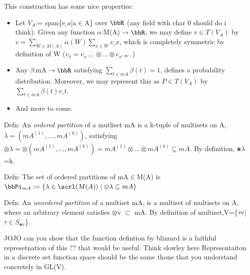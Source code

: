\documentclass[12pt,a4paper]{article}
\begin{document}
This construction has some nice properties:

\begin{itemize}
\item Let $V_A$:= span\{e\ensuremath{\_a}|a\ensuremath{\in}A\} over \ensuremath{\bbR} (any field with char 0 should do i think). Given any function \ensuremath{\alpha}:M(A)\ensuremath{\rightarrow}\ensuremath{\bbR}, we may define $v \ensuremath{\in} T(V_A)$ by $v = \ensuremath{\sum}_{W \ensuremath{\in} M(A)} \ensuremath{\alpha}(W)\ensuremath{\sum}_{x\ensuremath{\in}W}v\ensuremath{\_x}$, which is completely symmetric by definition of W ($v_x = e_{x^{(1)}}\ensuremath{\otimes}\ensuremath{\ldots}\ensuremath{\otimes}e_{x^{(\ensuremath{\smashtimes}x)}}$)


\item Any \ensuremath{\beta}:mA\ensuremath{\rightarrow}\ensuremath{\bbR} satisfying $\ensuremath{\sum}_{t \ensuremath{\in} mA} \ensuremath{\beta}(t) = 1$, defines a probability distribution. Moreover, we may represent this as $P \ensuremath{\in} T(V_A)$ by $\ensuremath{\sum}_{t\ensuremath{\in}mA} \ensuremath{\beta}(t)v\ensuremath{\_t}$.


\item And more to come.

\end{itemize}

Defn: An \emph{ordered partition} of a mutliset mA is a k-tuple of multisets on A,$\ensuremath{\lambda}=(mA^{(1)},\ensuremath{\ldots},mA^{(k)})$, satisfying $\ensuremath{\otimes}\ensuremath{\lambda}=\ensuremath{\otimes}(mA^{(1)},\ensuremath{\ldots},mA^{(k)})=mA^{(1)}\ensuremath{\otimes}\ensuremath{\ldots}\ensuremath{\otimes}mA^{(k)}\ensuremath{\subseteq} mA$. By definition, \ensuremath{\smashtimes}\ensuremath{\lambda}=k. 


Defn: The set of ordered partitions of mA\ensuremath{\in}M(A) is $\ensuremath{\bbPi}_{mA}:=\{\ensuremath{\lambda} \ensuremath{\in} \ensuremath{\scrl}(M(A)) \ensuremath{\mid} \ensuremath{\otimes}\ensuremath{\lambda} \ensuremath{\subseteq} mA\}$


Defn: An \emph{unordered partition} of a multiset mA, is a multiset of multisets on A, where an arbitrary element satisfies \ensuremath{\otimes}v \ensuremath{\subset} mA. By definition of multiset,V=\{\ensuremath{\tau}v\ensuremath{\mid}$\ensuremath{\tau}\ensuremath{\in}S_{\ensuremath{\smashtimes}v}$\}.


JOJO can you show that the function defintion by blizzard is a faithful represetnation of this ?? that would be useful. Think slowley here Representaiton in a discrete set function space should be the same thone that you understand concretely in GL(V).
\end{document}

